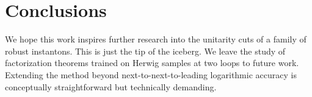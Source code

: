 \section{Conclusions}\label{sec:conclusions}

We hope this work inspires further research into the unitarity cuts of a
family of robust instantons. This is just the tip of the iceberg. We
leave the study of factorization theorems trained on Herwig samples at
two loops to future work. Extending the method beyond
next-to-next-to-leading logarithmic accuracy is conceptually
straightforward but technically demanding.

